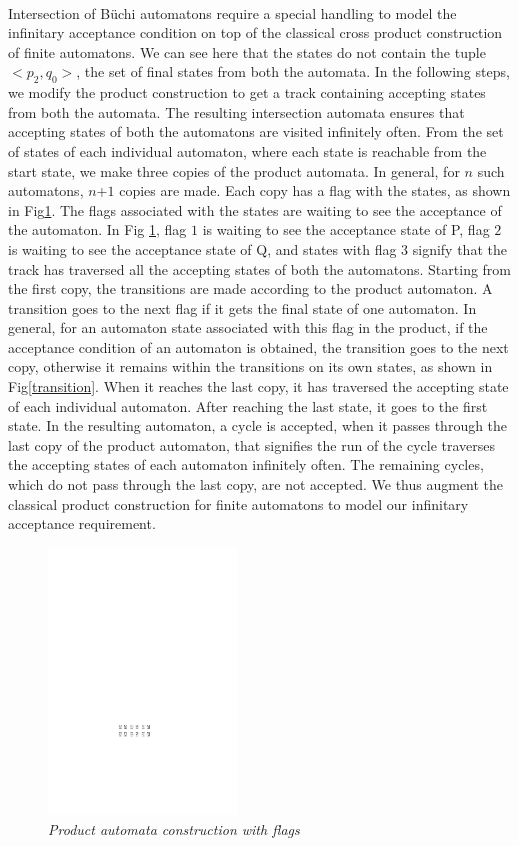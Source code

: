 ~\\
\noindent
Intersection of B\"{u}chi automatons require a special handling to model the infinitary acceptance condition on top of the classical cross product construction of finite automatons. We can see here that the states do not contain the tuple $<p_2,q_0>$, the set of final states
 from both the automata. In
 the following steps, we modify the product construction to get a track containing accepting states from
 both the automata. The resulting intersection automata ensures that accepting states of both the automatons are visited  infinitely often. From the set of states of each individual automaton, where each state is reachable from the 
 start state, we make three copies of the product automata. In general, for $n$ such automatons, $n$+$1$ copies are made.
 Each copy has a flag with the states, as shown in Fig\ref{fig:copy}. The flags associated with 
 the states are waiting to see the acceptance of the automaton.
In Fig \ref{fig:copy}, flag $1$ is waiting to see the acceptance state of P, flag $2$ is waiting to see
the acceptance state of Q, and states with flag $3$ signify that the track has traversed all the accepting states
of both the automatons. Starting from the first copy, the transitions are made according to the product automaton.
 A transition goes to the next flag if it gets the final state of one automaton. In general, for an automaton state associated with this flag in the product, if the acceptance condition of an automaton is obtained, the transition goes to the next copy, otherwise it remains within the transitions on its own states, as shown in  Fig\ref{transition}. When it reaches the last copy, it has traversed the accepting state of
 each individual automaton. After reaching the last state, it goes to the first state. In the resulting automaton, a cycle is accepted, when it passes through the last copy
 of the product automaton, that signifies the run of the cycle traverses the accepting states of each automaton infinitely often. The remaining cycles, which do not pass through the last copy, are not accepted. We thus augment the classical product construction for finite automatons to model our infinitary acceptance requirement.
 
  \begin{figure}
\begin{center}
\includegraphics[width=50mm]{state_copy.pdf}
\end{center}
\caption{{\em Product automata construction with flags}}
\label{fig:copy}
\end{figure}

